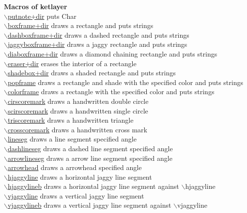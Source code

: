\documentclass[papersize,a4paper,12pt]{article}
\newcommand{\bs}{$\backslash$}
\begin{document}
\begin{tabbing}
{\bf Macros of ketlayer} \> \\
\hyperlink{putnote}{\bs putnote+dir} \> puts Char\\
\hyperlink{boxframe}{\bs boxframe+dir} \> draws a rectangle and puts strings\\
\hyperlink{dashboxframe}{\bs dashboxframe+dir} \> draws a dashed rectangle and puts strings\\
\hyperlink{jaggyboxframe}{\bs jaggyboxframe+dir} \> draws a jaggy rectangle and puts strings\\
\hyperlink{diaboxframe}{\bs diaboxframe+dir} \> draws a diamond chaining rectangle and puts strings\\
\hyperlink{eraser}{\bs eraser+dir} \> erases the interior of a rectangle\\
\hyperlink{shadebox}{\bs shadebox+dir} \> draws a shaded rectangle and puts strings\\
\hyperlink{popframe}{\bs popframe} \> draws a rectangle and shade with the specified color and puts strings\\
\hyperlink{colorframe}{\bs colorframe} \> draws a rectangle with the specified color and puts strings\\
\hyperlink{cirscoremark}{\bs cirscoremark} \> draws a handwritten double circle\\
\hyperlink{scirscoremark}{\bs scirscoremark} \> draws a handwritten single circle\\
\hyperlink{triscoremark}{\bs triscoremark} \> draws a handwritten triangle\\
\hyperlink{crosscoremark}{\bs crosscoremark} \> draws a handwritten cross mark\\
\hyperlink{lineseg}{\bs lineseg} \> draws a line segment specified angle\\
\hyperlink{dashlineseg}{\bs dashlineseg} \> draws a dashed line segment specified angle\\
\hyperlink{arrowlineseg}{\bs arrowlineseg} \> draws a arrow line segment specified angle\\
\hyperlink{arrowhead}{\bs arrowhead} \> draws a arrowhead specified angle\\
\hyperlink{hjaggyline}{\bs hjaggyline} \> draws a horizontal jaggy line segment\\
\hyperlink{hjaggylineb}{\bs hjaggylineb} \> draws a horizontal jaggy line segment against \bs hjaggyline\\
\hyperlink{vjaggyline}{\bs vjaggyline} \> draws a vertical jaggy line segment\\
\hyperlink{vjaggylineb}{\bs vjaggylineb} \> draws a vertical jaggy line segment against \bs vjaggyline\\

\end{tabbing}
\end{document}
